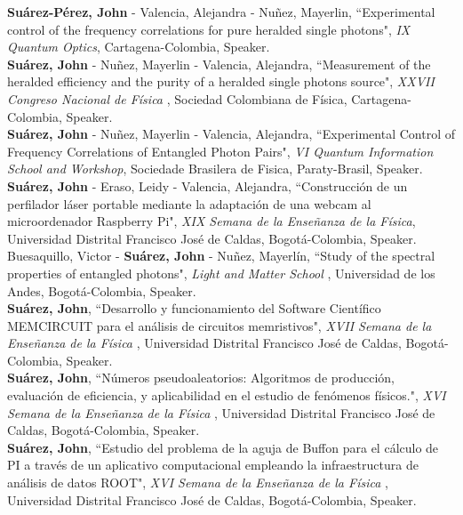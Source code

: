 \documentclass[10pt, a4paper]{article}
\newcommand{\years}[1]{\marginnote{\scriptsize #1}}
\begin{document}
\years{2018}\textbf{Suárez-Pérez, John} - Valencia, Alejandra - Nuñez, Mayerlin, “Experimental control of the frequency correlations for pure heralded single photons", \emph{IX Quantum Optics}, Cartagena-Colombia, Speaker.\\

\years{2017}\textbf{Suárez, John} - Nuñez, Mayerlin - Valencia, Alejandra, “Measurement of the heralded efficiency and the purity of a heralded single photons source", \emph{XXVII Congreso Nacional de Física} , Sociedad Colombiana de Física, Cartagena-Colombia, Speaker.\\

\years{2017}\textbf{Suárez, John} - Nuñez, Mayerlin - Valencia, Alejandra, “Experimental Control of Frequency Correlations of Entangled Photon Pairs", \emph{VI Quantum Information School and Workshop}, Sociedade Brasilera de Fisica, Paraty-Brasil, Speaker.\\

\years{2016}\textbf{Suárez, John} - Eraso, Leidy - Valencia, Alejandra, “Construcción de un perfilador láser portable mediante la adaptación de una webcam al microordenador Raspberry Pi", \emph{XIX Semana de la Enseñanza de la Física}, Universidad Distrital Francisco José de Caldas, Bogotá-Colombia, Speaker.\\

\years{2016}Buesaquillo, Victor - \textbf{Suárez, John} - Nuñez, Mayerlín, “Study of the spectral properties of entangled photons", \emph{Light and Matter School }, Universidad de los Andes, Bogotá-Colombia, Speaker.\\

\years{2014}\textbf{Suárez, John}, “Desarrollo y funcionamiento del Software Científico MEMCIRCUIT para el análisis de circuitos memristivos", \emph{XVII Semana de la Enseñanza de la Física }, Universidad Distrital Francisco José de Caldas, Bogotá-Colombia, Speaker.\\

\years{2013}\textbf{Suárez, John}, “Números pseudoaleatorios: Algoritmos de producción, evaluación de eficiencia, y aplicabilidad en el estudio de fenómenos físicos.", \emph{XVI Semana de la Enseñanza de la Física }, Universidad Distrital Francisco José de Caldas, Bogotá-Colombia, Speaker.\\

\years{2013}\textbf{Suárez, John}, “Estudio del problema de la aguja de Buffon para el cálculo de PI a través de un aplicativo computacional empleando la infraestructura de análisis de datos ROOT", \emph{XVI Semana de la Enseñanza de la Física }, Universidad Distrital Francisco José de Caldas, Bogotá-Colombia, Speaker.\\
\end{document}

